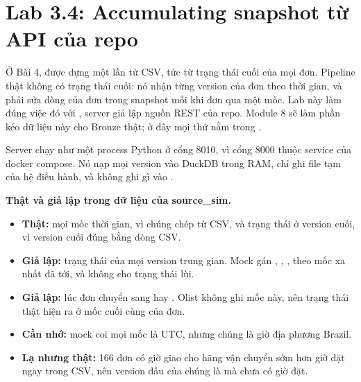 \section{Lab 3.4: Accumulating snapshot từ API của repo}

Ở Bài 4,  được dựng một lần từ CSV, tức từ trạng thái cuối của mọi đơn. Pipeline thật không có trạng thái cuối: nó nhận từng version của đơn theo thời gian, và phải sửa dòng của đơn trong snapshot mỗi khi đơn qua một mốc. Lab này làm đúng việc đó với , server giả lập nguồn REST của repo. Module 8 sẽ làm phần kéo dữ liệu này cho Bronze thật; ở đây mọi thứ nằm trong .

Server chạy như một process Python ở cổng 8010, vì cổng 8000 thuộc service  của docker compose. Nó nạp mọi version vào DuckDB trong RAM, chỉ ghi file tạm của hệ điều hành, và không ghi gì vào .

\begin{luuy}
\textbf{Thật và giả lập trong dữ liệu của source\_sim.}
\begin{itemize}
  \item \textbf{Thật:} mọi mốc thời gian, vì chúng chép từ CSV, và trạng thái ở version cuối, vì version cuối đúng bằng dòng CSV.
  \item \textbf{Giả lập:} trạng thái của mọi version trung gian. Mock gán , , ,  theo mốc xa nhất đã tới, và không cho trạng thái lùi.
  \item \textbf{Giả lập:} lúc đơn chuyển sang  hay . Olist không ghi mốc này, nên trạng thái thật hiện ra ở mốc cuối cùng của đơn.
  \item \textbf{Cần nhớ:} mock coi mọi mốc là UTC, nhưng chúng là giờ địa phương Brazil.
  \item \textbf{Lạ nhưng thật:} 166 đơn có giờ giao cho hãng vận chuyển sớm hơn giờ đặt ngay trong CSV, nên version đầu của chúng là  mà chưa có giờ đặt.
\end{itemize}
\end{luuy}

